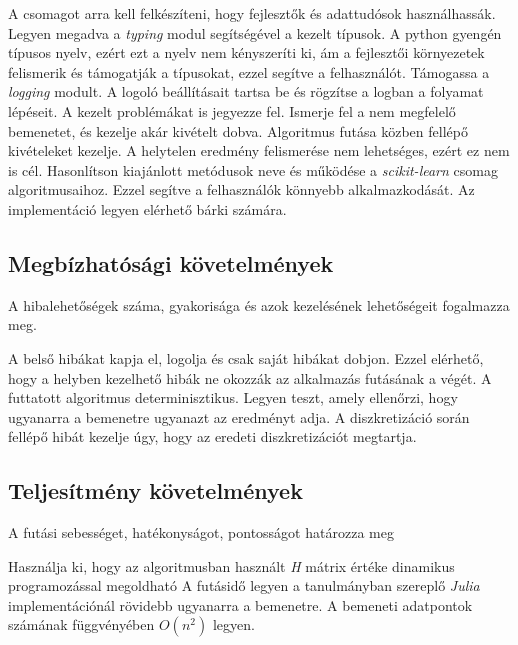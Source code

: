 \begin{enumerate}[resume]
     A csomagot arra kell felkészíteni, hogy fejlesztők és adattudósok használhassák.
     Legyen megadva a \textit{typing} modul segítségével a kezelt típusok. A python gyengén típusos nyelv, ezért ezt a nyelv nem kényszeríti ki, ám a fejlesztői környezetek felismerik és támogatják a típusokat, ezzel segítve a felhasználót.
     Támogassa a \textit{logging} modult. A logoló beállításait tartsa be és rögzítse a logban a folyamat lépéseit. A kezelt problémákat is jegyezze fel.
     Ismerje fel a nem megfelelő bemenetet, és kezelje akár kivételt dobva.
     Algoritmus futása közben fellépő kivételeket kezelje. A helytelen eredmény felismerése nem lehetséges, ezért ez nem is cél.
     Hasonlítson kiajánlott metódusok neve és működése a \textit{scikit-learn} csomag algoritmusaihoz. Ezzel segítve a felhasználók könnyebb alkalmazkodását.
     Az implementáció legyen elérhető bárki számára.
\end{enumerate}

\subsection{Megbízhatósági követelmények}
A hibalehetőségek száma, gyakorisága és azok kezelésének lehetőségeit fogalmazza meg.

\begin{enumerate}[resume]
     A belső hibákat kapja el, logolja és csak saját hibákat dobjon. Ezzel elérhető, hogy a helyben kezelhető hibák ne okozzák az alkalmazás futásának a végét.
     A futtatott algoritmus determinisztikus. Legyen teszt, amely ellenőrzi, hogy ugyanarra a bemenetre ugyanazt az eredményt adja.
     A diszkretizáció során fellépő hibát kezelje úgy, hogy az eredeti diszkretizációt megtartja.
\end{enumerate}

\subsection{Teljesítmény követelmények}
A futási sebességet, hatékonyságot, pontosságot határozza meg

\begin{enumerate}[resume]
     Használja ki, hogy az algoritmusban használt \textit{H} mátrix értéke dinamikus programozással megoldható
     A futásidő legyen a tanulmányban szereplő \textit{Julia} implementációnál rövidebb ugyanarra a bemenetre.
     A bemeneti adatpontok számának függvényében $O(n^2)$ legyen.
\end{enumerate}

